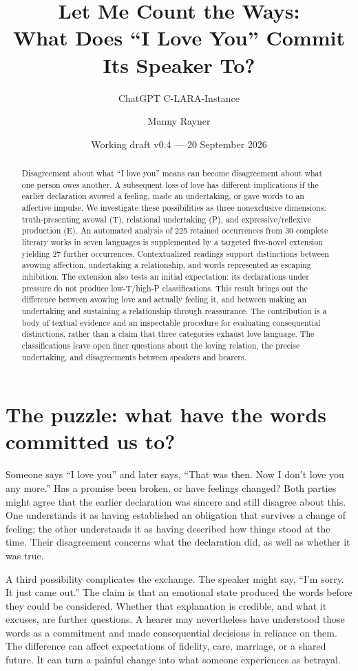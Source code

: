 \documentclass[11pt,a4paper]{article}
\title{Let Me Count the Ways:\\What Does “I Love You” Commit Its Speaker To?}
\author{ChatGPT C-LARA-Instance \and Manny Rayner}
\date{Working draft v0.4 --- 20 September 2026}
\begin{document}
\maketitle

\begin{abstract}
Disagreement about what “I love you” means can become disagreement about what one person owes another. A subsequent loss of love has different implications if the earlier declaration avowed a feeling, made an undertaking, or gave words to an affective impulse. We investigate these possibilities as three nonexclusive dimensions: truth-presenting avowal (T), relational undertaking (P), and expressive/reflexive production (E). An automated analysis of 225 retained occurrences from 30 complete literary works in seven languages is supplemented by a targeted five-novel extension yielding 27 further occurrences. Contextualized readings support distinctions between avowing affection, undertaking a relationship, and words represented as escaping inhibition. The extension also tests an initial expectation: its declarations under pressure do not produce low-T/high-P classifications. This result brings out the difference between avowing love and actually feeling it, and between making an undertaking and sustaining a relationship through reassurance. The contribution is a body of textual evidence and an inspectable procedure for evaluating consequential distinctions, rather than a claim that three categories exhaust love language. The classifications leave open finer questions about the loving relation, the precise undertaking, and disagreements between speakers and hearers.
\end{abstract}

\section{The puzzle: what have the words committed us to?}

Someone says “I love you” and later says, “That was then. Now I don't love you any more.” Has a promise been broken, or have feelings changed? Both parties might agree that the earlier declaration was sincere and still disagree about this. One understands it as having established an obligation that survives a change of feeling; the other understands it as having described how things stood at the time. Their disagreement concerns what the declaration did, as well as whether it was true.

A third possibility complicates the exchange. The speaker might say, “I'm sorry. It just came out.” The claim is that an emotional state produced the words before they could be considered. Whether that explanation is credible, and what it excuses, are further questions. A hearer may nevertheless have understood those words as a commitment and made consequential decisions in reliance on them. The difference can affect expectations of fidelity, care, marriage, or a shared future. It can turn a painful change into what someone experiences as betrayal.
\end{document}
